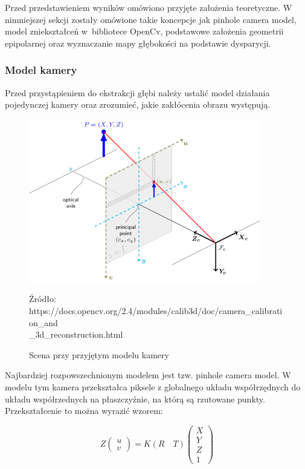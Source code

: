 \documentclass[oneside, eng]{mgr}
\begin{document}
Przed przedstawieniem wyników omówiono przyjęte założenia teoretyczne. W nimniejszej sekcji zostały omówione takie koncepcje jak pinhole camera model, model zniekształceń w~bibliotece OpenCv, podstawowe założenia geometrii epipolarnej oraz wyznaczanie mapy głębokości na podstawie dysparycji.

\subsubsection{Model kamery}
Przed przystąpieniem do ekstrakcji głębi należy ustalić model działania pojedynczej kamery oraz zrozumieć, jakie zakłócenia obrazu występują.

\begin{figure}
\centering
	\includegraphics[width=0.90\textwidth]{img/pinhole_camera_model.png}\par\vspace{1cm}
\caption{Scena przy przyjętym modelu kamery}
Źródło: https://docs.opencv.org/2.4/modules/calib3d/doc/camera\_calibration\_and\\\_3d\_reconstruction.html
	\label{fig:camera_model}
\end{figure}

Najbardziej rozpowszechnionym modelem jest tzw. pinhole camera model. W modelu tym kamera przekształca piksele z globalnego układu współrzędnych do układu współrzednych na płaszczyźnie, na którą są rzutowane punkty. Przekształcenie to można wyrazić wzorem:

\begin{equation}
	Z
	\left( \begin{array}{l}
		u \\
		v 
	\end{array} \right) 
	= K (R \quad T) 
	\left( \begin{array}{l}
		X \\	Y \\	Z \\	1
	\end{array} \right) 
\end{equation}
\end{document}
